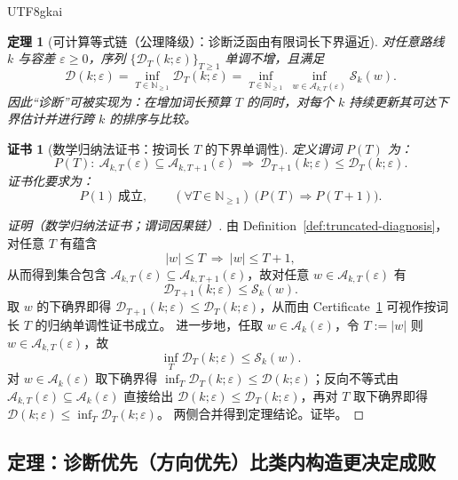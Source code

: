 \documentclass[12pt]{article}
\newtheorem{theorem}{定理}[section]
\newtheorem{certificate}{证书}[section]
\begin{document}
\begin{CJK*}{UTF8}{gkai}
\begin{theorem}[可计算等式链（公理降级）：诊断泛函由有限词长下界逼近]
\label{thm:computable-diagnosis-chain}
对任意路线 $k$ 与容差 $\varepsilon\ge 0$，序列 $\{\mathcal{D}_T(k;\varepsilon)\}_{T\ge 1}$ 单调不增，且满足
\[
\mathcal{D}(k;\varepsilon)
=
\inf_{T\in\mathbb{N}_{\ge 1}}\mathcal{D}_T(k;\varepsilon)
=
\inf_{T\in\mathbb{N}_{\ge 1}}\ \inf_{w\in \mathcal{A}_{k,T}(\varepsilon)} \mathcal{S}_k(w).
\]
因此“诊断”可被实现为：在增加词长预算 $T$ 的同时，对每个 $k$ 持续更新其可达下界估计并进行跨 $k$ 的排序与比较。
\end{theorem}

\begin{certificate}[数学归纳法证书：按词长 $T$ 的下界单调性]
\label{cert:computable-diagnosis-induction}
定义谓词 $P(T)$ 为：
\[
P(T):\ \mathcal{A}_{k,T}(\varepsilon)\subseteq \mathcal{A}_{k,T+1}(\varepsilon)\ \Rightarrow\ \mathcal{D}_{T+1}(k;
  \varepsilon)\le \mathcal{D}_T(k;\varepsilon).
\]
证书化要求为：
\[
P(1)\ \text{成立},\qquad
(\forall T\in\mathbb{N}_{\ge 1})\ \bigl(P(T)\Rightarrow P(T+1)\bigr).
\]
\end{certificate}

\begin{proof}[证明（数学归纳法证书；谓词因果链）]
由 Definition~\ref{def:truncated-diagnosis}，对任意 $T$ 有蕴含
\[
|w|\le T\ \Rightarrow\ |w|\le T+1,
\]
从而得到集合包含 $\mathcal{A}_{k,T}(\varepsilon)\subseteq \mathcal{A}_{k,T+1}(\varepsilon)$，故对任意 $w\in \mathcal{A}_{k,T}
  (\varepsilon)$ 有
\[
\mathcal{D}_{T+1}(k;\varepsilon)\le \mathcal{S}_k(w).
\]
取 $w$ 的下确界即得 $\mathcal{D}_{T+1}(k;\varepsilon)\le \mathcal{D}_T(k;\varepsilon)$，从而由 Certificate~\ref{cert:computable-diagnosis-induction} 可视作按词长 $T$ 的归纳单调性证书成立。
进一步地，任取 $w\in\mathcal{A}_k(\varepsilon)$，令 $T:=|w|$ 则 $w\in \mathcal{A}_{k,T}(\varepsilon)$，故
\[
\inf_{T}\mathcal{D}_T(k;\varepsilon)\le \mathcal{S}_k(w).
\]
对 $w\in\mathcal{A}_k(\varepsilon)$ 取下确界得 $\inf_T\mathcal{D}_T(k;\varepsilon)\le \mathcal{D}(k;\varepsilon)$；反向不等式由
  $\mathcal{A}_{k,T}(\varepsilon)\subseteq \mathcal{A}_k(\varepsilon)$ 直接给出 $\mathcal{D}(k;\varepsilon)\le \mathcal{D}
  _T(k;\varepsilon)$，再对 $T$ 取下确界即得 $\mathcal{D}(k;\varepsilon)\le \inf_T\mathcal{D}_T(k;\varepsilon)$。
两侧合并得到定理结论。证毕。
\end{proof}

\subsection{定理：诊断优先（方向优先）比类内构造更决定成败}


\end{CJK*}
\end{document}
